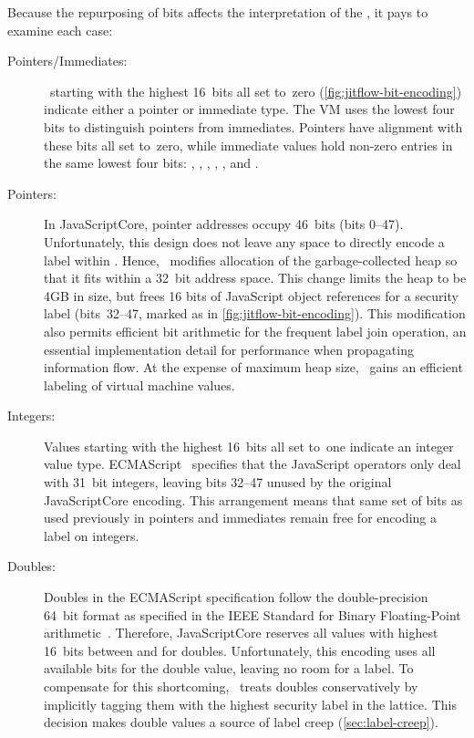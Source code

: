 Because the repurposing of bits affects the interpretation of the \jsvalue, it pays to examine each case:

\begin{description}

\item[Pointers/Immediates:]
\jsvalues\ starting with the highest 16~bits all set to~zero (\autoref{fig:jitflow-bit-encoding}) indicate either a pointer or immediate type.
The VM uses the lowest four bits to distinguish pointers from immediates.
Pointers have alignment with these bits all set to~zero, while immediate values hold non-zero entries in the same lowest four bits: , , , , , and .

\item[Pointers:]
In JavaScriptCore, pointer addresses occupy 46~bits (bits 0--47).
Unfortunately, this design does not leave any space to directly encode a label within \jsvalues.
Hence, \JitFlow\ modifies allocation of the garbage-collected heap so that it fits within a 32~bit address space.
This change limits the heap to be 4GB in size, but frees 16 bits of JavaScript object references for a security label (bits~32--47, marked as  in \autoref{fig:jitflow-bit-encoding}).
This modification also permits efficient bit arithmetic for the frequent label join operation, an essential implementation detail for performance when propagating information flow.
At the expense of maximum heap size, \JitFlow\ gains an efficient labeling of virtual machine values.

\item[Integers:]
Values starting with the highest 16~bits all set to~one indicate an integer value type.
ECMAScript~\cite{ecma} specifies that the JavaScript operators only deal with 31~bit integers, leaving bits 32--47 unused by the original JavaScriptCore encoding.
This arrangement means that same set of bits as used previously in pointers and immediates remain free for encoding a label on integers.

\item[Doubles:]
Doubles in the ECMAScript specification follow the double-precision 64~bit format as specified in the IEEE Standard for Binary Floating-Point arithmetic~\cite{ieee754}.
Therefore, JavaScriptCore reserves all values with highest 16~bits between  and  for doubles.
Unfortunately, this encoding uses all available bits for the double value, leaving no room for a label.
To compensate for this shortcoming, \JitFlow\ treats doubles conservatively by implicitly tagging them with the highest security label in the lattice.
This decision makes double values a source of label creep (\autoref{sec:label-creep}).

\end{description}

